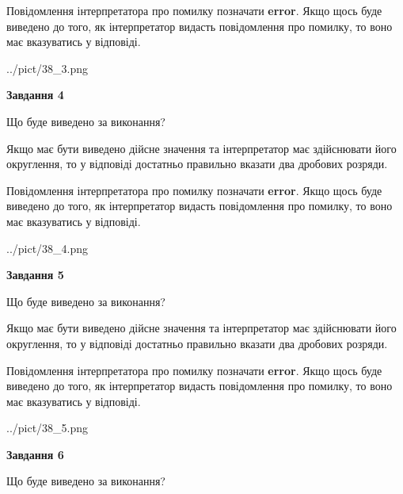 \documentclass[12pt, ukrainian]{article}
\begin{document}
{\begin {Large}
Повідомлення інтерпретатора про помилку позначати \textbf{error}.
Якщо щось буде виведено до того, як інтерпретатор видасть повідомлення про помилку, 
то воно має вказуватись у відповіді. \par

\begin{center}
	{../pict/38_3.png}
\end{center}
\newpage

{\begin {center}\textbf{Завдання 4}\end {center}}\par
Що буде виведено за виконання? \par

Якщо має бути виведено дійсне значення та інтерпретатор має здійснювати його округлення, 
то у відповіді достатньо правильно вказати два дробових розряди.

Повідомлення інтерпретатора про помилку позначати \textbf{error}.
Якщо щось буде виведено до того, як інтерпретатор видасть повідомлення про помилку, 
то воно має вказуватись у відповіді. \par

\begin{center}
	{../pict/38_4.png}
\end{center}
\newpage

{\begin {center}\textbf{Завдання 5}\end {center}}\par
Що буде виведено за виконання? \par

Якщо має бути виведено дійсне значення та інтерпретатор має здійснювати його округлення, 
то у відповіді достатньо правильно вказати два дробових розряди.

Повідомлення інтерпретатора про помилку позначати \textbf{error}.
Якщо щось буде виведено до того, як інтерпретатор видасть повідомлення про помилку, 
то воно має вказуватись у відповіді. \par

\begin{center}
	{../pict/38_5.png}
\end{center}
\newpage

{\begin {center}\textbf{Завдання 6}\end {center}}\par
Що буде виведено за виконання? \par


\end{Large}}
\end{document}

